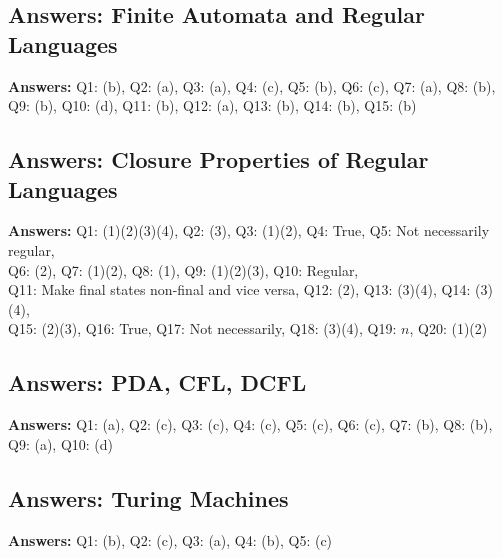 \subsection*{Answers: Finite Automata and Regular Languages}
\noindent\textbf{Answers:} Q1: (b), Q2: (a), Q3: (a), Q4: (c), Q5: (b), Q6: (c), Q7: (a), Q8: (b), Q9: (b), Q10: (d), Q11: (b), Q12: (a), Q13: (b), Q14: (b), Q15: (b)

\subsection*{Answers: Closure Properties of Regular Languages}
\noindent \textbf{Answers:} Q1: (1)(2)(3)(4), Q2: (3), Q3: (1)(2), Q4: True, Q5: Not necessarily regular,\\
Q6: (2), Q7: (1)(2), Q8: (1), Q9: (1)(2)(3), Q10: Regular, \\
Q11: Make final states non-final and vice versa, Q12: (2), Q13: (3)(4), Q14: (3)(4),\\
Q15: (2)(3), Q16: True, Q17: Not necessarily, Q18: (3)(4), Q19: $n$, Q20: (1)(2)

\subsection*{Answers: PDA, CFL, DCFL}
\noindent\textbf{Answers:} Q1: (a), Q2: (c), Q3: (c), Q4: (c), Q5: (c), Q6: (c), Q7: (b), Q8: (b), Q9: (a), Q10: (d)

\subsection*{Answers: Turing Machines}
\noindent\textbf{Answers:} Q1: (b), Q2: (c), Q3: (a), Q4: (b), Q5: (c)